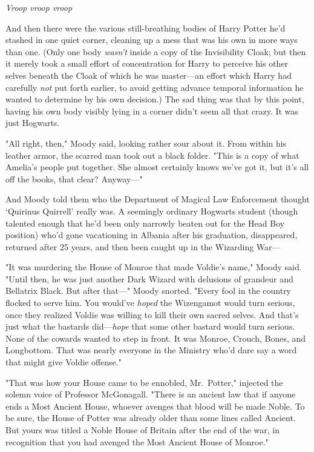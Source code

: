 \emph{Vroop{\el} vroop{\el} vroop}{\el}

And then there were the various still-breathing bodies of Harry Potter he'd
stashed in one quiet corner, cleaning up a mess that was his own in more ways
than one. (Only one body \emph{wasn't} inside a copy of the Invisibility Cloak;
but then it merely took a small effort of concentration for Harry to perceive
his other selves beneath the Cloak of which he was master---an effort which
Harry had carefully \emph{not} put forth earlier, to avoid getting advance
temporal information he wanted to determine by his own decision.) The sad thing
was that by this point, having his own body visibly lying in a corner didn't
seem all that crazy. It was just{\el} Hogwarts.

"All right, then," Moody said, looking rather sour about it. From within his
leather armor, the scarred man took out a black folder. "This is a copy of what
Amelia's people put together. She almost certainly knows we've got it, but it's
all off the books, that clear? Anyway---"

And Moody told them who the Department of Magical Law Enforcement thought
`Quirinus Quirrell' really was. A seemingly ordinary Hogwarts student (though
talented enough that he'd been only narrowly beaten out for the Head Boy
position) who'd gone vacationing in Albania after his graduation, disappeared,
returned after 25 years, and then been caught up in the Wizarding War---

"It was murdering the House of Monroe that made Voldie's name," Moody said.
"Until then, he was just another Dark Wizard with delusions of grandeur and
Bellatrix Black. But after that---" Moody snorted. "Every fool in the country
flocked to serve him. You would've \emph{hoped} the Wizengamot would turn
serious, once they realized Voldie was willing to kill their own sacred selves.
And that's just what the bastards did---\emph{hope} that some other bastard
would turn serious. None of the cowards wanted to step in front. It was Monroe,
Crouch, Bones, and Longbottom. That was nearly everyone in the Ministry who'd
dare say a word that might give Voldie offense."

"That was how your House came to be ennobled, Mr.~Potter," injected the solemn
voice of Professor McGonagall. "There is an ancient law that if anyone ends a
Most Ancient House, whoever avenges that blood will be made Noble. To be sure,
the House of Potter was already older than some lines called Ancient. But yours
was titled a Noble House of Britain after the end of the war, in recognition
that you had avenged the Most Ancient House of Monroe."

